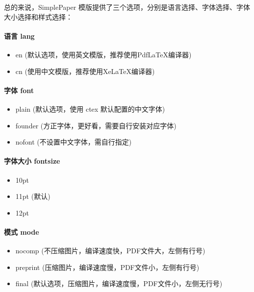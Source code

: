 总的来说，SimplePaper 模版提供了三个选项，分别是语言选择、字体选择、字体大小选择和样式选择：

\paragraph{语言 lang}
\begin{itemize}
    \item en (默认选项，使用英文模版，推荐使用PdfLaTeX编译器)
    \item cn (使用中文模版，推荐使用XeLaTeX编译器)
\end{itemize}

\paragraph{字体 font}
\begin{itemize}
    \item plain (默认选项，使用 ctex 默认配置的中文字体)
    \item founder (方正字体，更好看，需要自行安装对应字体)
    \item nofont (不设置中文字体，需自行指定)
\end{itemize}

\paragraph{字体大小 fontsize}
\begin{itemize}
    \item 10pt
    \item 11pt (默认)
    \item 12pt
\end{itemize}

\paragraph{模式 mode}
\begin{itemize}
    \item nocomp (不压缩图片，编译速度快，PDF文件大，左侧有行号)
    \item preprint (压缩图片，编译速度慢，PDF文件小，左侧有行号)
    \item final (默认选项，压缩图片，编译速度慢，PDF文件小，左侧无行号)
\end{itemize}